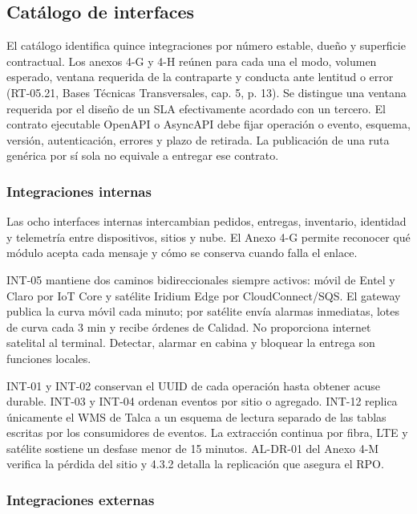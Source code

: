 \subsection{Catálogo de interfaces}
\label{sec:catalogo-interfaces}

El catálogo identifica quince integraciones por número estable, dueño y superficie contractual. Los anexos 4-G y 4-H reúnen para cada una el modo, volumen esperado, ventana requerida de la contraparte y conducta ante lentitud o error (RT-05.21, Bases Técnicas Transversales, cap. 5, p. 13). Se distingue una ventana requerida por el diseño de un SLA efectivamente acordado con un tercero. El contrato ejecutable OpenAPI o AsyncAPI debe fijar operación o evento, esquema, versión, autenticación, errores y plazo de retirada. La publicación de una ruta genérica por sí sola no equivale a entregar ese contrato.

\subsubsection{Integraciones internas}

Las ocho interfaces internas intercambian pedidos, entregas, inventario, identidad y telemetría entre dispositivos, sitios y nube. El Anexo 4-G permite reconocer qué módulo acepta cada mensaje y cómo se conserva cuando falla el enlace.

INT-05 mantiene dos caminos bidireccionales siempre activos: móvil de Entel y Claro por IoT Core y satélite Iridium Edge por CloudConnect/SQS. El gateway publica la curva móvil cada minuto; por satélite envía alarmas inmediatas, lotes de curva cada 3 min y recibe órdenes de Calidad. No proporciona internet satelital al terminal. Detectar, alarmar en cabina y bloquear la entrega son funciones locales.


INT-01 y INT-02 conservan el UUID de cada operación hasta obtener acuse durable. INT-03 y INT-04 ordenan eventos por sitio o agregado. INT-12 replica únicamente el WMS de Talca a un esquema de lectura separado de las tablas escritas por los consumidores de eventos. La extracción continua por fibra, LTE y satélite sostiene un desfase menor de 15 minutos. AL-DR-01 del Anexo 4-M verifica la pérdida del sitio y 4.3.2 detalla la replicación que asegura el RPO.

\subsubsection{Integraciones externas}

